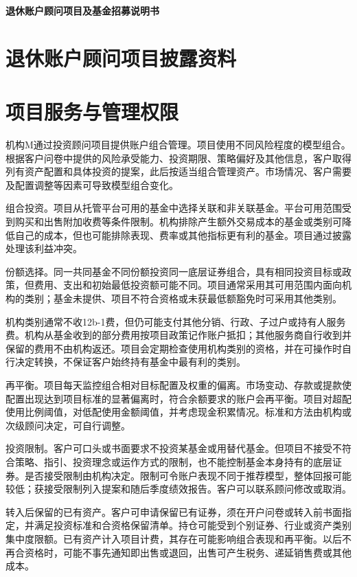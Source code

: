 \documentclass[UTF8,fontset=none,11pt,a4paper]{ctexart}
\begin{document}
{\noindent\LARGE\bfseries 退休账户顾问项目及基金招募说明书\par}
\vspace{10pt}
\section*{退休账户顾问项目披露资料}
\section*{项目服务与管理权限}
机构M通过投资顾问项目提供账户组合管理。项目使用不同风险程度的模型组合。根据客户问卷中提供的风险承受能力、投资期限、策略偏好及其他信息，客户取得列有资产配置和具体投资的提案，此后按适当组合管理资产。市场情况、客户需要及配置调整等因素可导致模型组合变化。


组合投资。项目从托管平台可用的基金中选择关联和非关联基金。平台可用范围受到购买和出售附加收费等条件限制。机构排除产生额外交易成本的基金或类别可降低自己的成本，但也可能排除表现、费率或其他指标更有利的基金。项目通过披露处理该利益冲突。


份额选择。同一共同基金不同份额投资同一底层证券组合，具有相同投资目标或政策，但费用、支出和初始最低投资额可能不同。项目通常采用其可用范围内面向机构的类别；基金未提供、项目不符合资格或未获最低额豁免时可采用其他类别。


机构类别通常不收12b-1费，但仍可能支付其他分销、行政、子过户或持有人服务费。机构从基金收到的部分费用按项目政策记作账户抵扣；其他服务商自行收到并保留的费用不由机构返还。项目会定期检查使用机构类别的资格，并在可操作时自行决定转换，不保证客户始终持有基金中最有利的类别。


再平衡。项目每天监控组合相对目标配置及权重的偏离。市场变动、存款或提款使配置出现达到项目标准的显著偏离时，符合余额要求的账户会再平衡。项目对超配使用比例阈值，对低配使用金额阈值，并考虑现金积累情况。标准和方法由机构或次级顾问决定，可自行调整。


投资限制。客户可口头或书面要求不投资某基金或用替代基金。但项目不接受不符合策略、指引、投资理念或运作方式的限制，也不能控制基金本身持有的底层证券。是否接受限制由机构决定。限制可令账户表现不同于推荐模型，整体回报可能较低；获接受限制列入提案和随后季度绩效报告。客户可以联系顾问修改或取消。


转入后保留的已有资产。客户可申请保留已有证券，须在开户问卷或转入前书面指定，并满足投资标准和合资格保留清单。持仓可能受到个别证券、行业或资产类别集中度限额。已有资产计入项目计费，其存在可能影响组合表现和再平衡。以后不再合资格时，可能不事先通知即出售或退回，出售可产生税务、递延销售费或其他成本。
\end{document}
